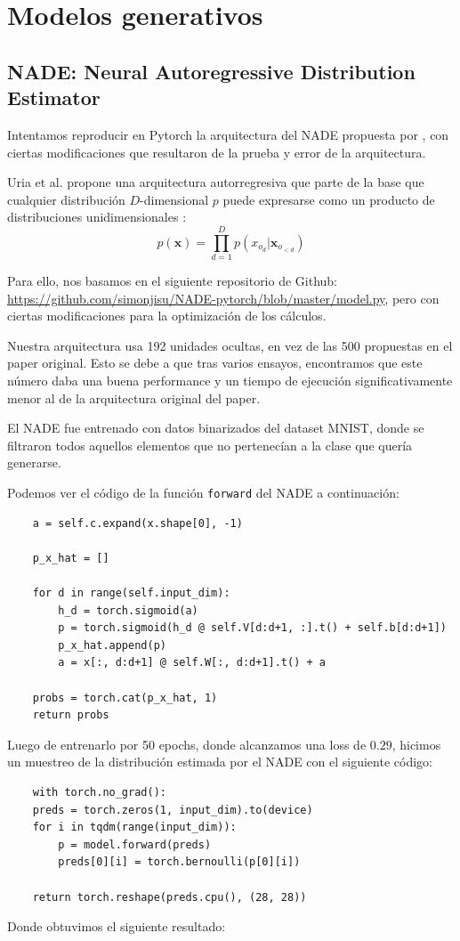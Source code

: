 \documentclass[11pt]{article}
\begin{document}
\newpage

\section{Modelos generativos}
\subsection{NADE: Neural Autoregressive Distribution Estimator}

Intentamos reproducir en Pytorch la arquitectura del NADE propuesta por \cite{nade}, con ciertas modificaciones que resultaron de la prueba y error de la arquitectura.

Uria et al. propone una arquitectura autorregresiva que parte de la base que cualquier distribución $D$-dimensional $p$ puede expresarse como un producto de distribuciones unidimensionales \cite{nade}:
$$
p(\boldsymbol{x}) = \prod_{d=1}^{D}p(x_{o_d} | \boldsymbol{x}_{o_{<d}})
$$

Para ello, nos basamos en el siguiente repositorio de Github: \url{https://github.com/simonjisu/NADE-pytorch/blob/master/model.py}, pero con ciertas modificaciones para la optimización de los cálculos.

Nuestra arquitectura usa 192 unidades ocultas, en vez de las 500 propuestas en el paper original. Esto se debe a que tras varios ensayos, encontramos que este número daba una buena performance y un tiempo de ejecución significativamente menor al de la arquitectura original del paper. 

El NADE fue entrenado con datos binarizados del dataset MNIST, donde se filtraron todos aquellos elementos que no pertenecían a la clase que quería generarse.

Podemos ver el código de la función \texttt{forward} del NADE a continuación:

\begin{verbatim}
    a = self.c.expand(x.shape[0], -1)

    p_x_hat = []

    for d in range(self.input_dim):
        h_d = torch.sigmoid(a)
        p = torch.sigmoid(h_d @ self.V[d:d+1, :].t() + self.b[d:d+1])
        p_x_hat.append(p)
        a = x[:, d:d+1] @ self.W[:, d:d+1].t() + a

    probs = torch.cat(p_x_hat, 1)
    return probs
\end{verbatim}

Luego de entrenarlo por 50 epochs, donde alcanzamos una loss de $0.29$, hicimos un muestreo de la distribución estimada por el NADE con el siguiente código:
\begin{verbatim}
    with torch.no_grad():
    preds = torch.zeros(1, input_dim).to(device)
    for i in tqdm(range(input_dim)):
        p = model.forward(preds)
        preds[0][i] = torch.bernoulli(p[0][i])

    return torch.reshape(preds.cpu(), (28, 28))
\end{verbatim}
Donde obtuvimos el siguiente resultado:
\end{document}

